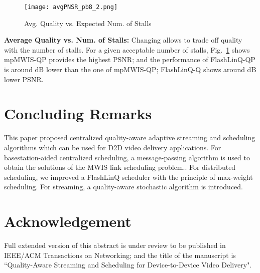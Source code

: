 \documentclass[journal]{IEEEtran}
\begin{document}
\begin{figure}[t!]
	\begin{center}
		\texttt{[image: avgPNSR\_pb8\_2.png]}
	\end{center}
\caption{Avg. Quality vs. Expected Num. of Stalls}
	\label{fig:stall2}
\end{figure}




\textbf{Average Quality vs. Num. of Stalls:}
Changing  allows to trade off quality with the number of stalls. For a given acceptable number of stalls,
Fig.~\ref{fig:stall2} shows mpMWIS-QP provides the highest PSNR; and the performance of FlashLinQ-QP is around  dB lower than the one of mpMWIS-QP; FlashLinQ-Q shows around  dB lower PSNR.

 \vspace{-1.0mm}
\section{Concluding Remarks}\label{sec:conclusion}
This paper proposed centralized quality-aware adaptive streaming and scheduling algorithms which can be used for D2D video delivery applications.
For basestation-aided centralized scheduling, a message-passing algorithm is used to obtain the solutions of the MWIS link scheduling problem..
For distributed scheduling, we improved a FlashLinQ scheduler with the principle of max-weight scheduling.
For streaming, a quality-aware stochastic algorithm is introduced.

 \vspace{-1.0mm}
\section*{Acknowledgement}\label{sec:conclusion}
Full extended version of this abstract is under review to be published in IEEE/ACM Transactions on Networking; and the title of the manuscript is ``Quality-Aware Streaming and Scheduling for Device-to-Device Video Delivery".
\end{document}
